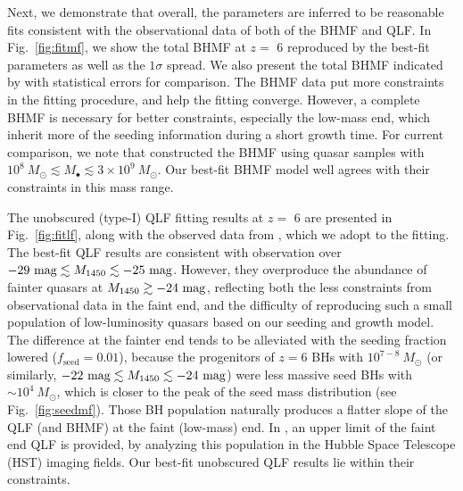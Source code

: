 \documentclass[twocolumn, twocolappendix]{aastex63}
\newcommand{\Msun}{M_\odot}
\newcommand{\Mbh}{M_\bullet}
\newcommand{\fseed}{f_\mathrm{seed}}
\newcommand{\Muv}{M_{1450}}
\begin{document}
\begin{CJK*}{UTF8}{gbsn}
Next, we demonstrate that overall, the parameters are inferred to be reasonable fits consistent with the observational data of both of the BHMF and QLF.
In Fig.~\ref{fig:fitmf}, we show the total BHMF at $z=$ 6 reproduced by the best-fit parameters as well as the $1\sigma$ spread.
We also present the total BHMF indicated by  with statistical errors for comparison.
The BHMF data put more constraints in the fitting procedure, and help the fitting converge.
However, a complete BHMF is necessary for better constraints, especially the low-mass end, 
which inherit more of the seeding information during a short growth time.
For current comparison,
we note that  constructed the BHMF using quasar samples with 
$10^8~\Msun \lesssim \Mbh \lesssim 3\times 10^9~\Msun$.
Our best-fit BHMF model well agrees with their constraints in this mass range.

The unobscured (type-I) QLF fitting results at $z=$ 6 are presented in Fig.~\ref{fig:fitlf},
along with the observed data from , which we adopt to the fitting.
The best-fit QLF results are consistent with observation over $-29~{\rm mag} \lesssim \Muv \lesssim -25~{\rm mag}$.
However, they overproduce the abundance of fainter quasars at $\Muv\gtrsim -24~{\rm mag}$,
reflecting both the less constraints from observational data in the faint end,
and the difficulty of reproducing such a small population of low-luminosity quasars based on our seeding and growth model.
The difference at the fainter end tends to be alleviated with the seeding fraction lowered ($\fseed = 0.01$),
because the progenitors of $z=6$ BHs with $10^{7-8}~\Msun$ (or similarly, 
$-22~{\rm mag} \lesssim \Muv \lesssim -24~{\rm mag}$) were less massive seed BHs with $\sim 10^4~\Msun$,
which is closer to the peak of the seed mass distribution (see Fig.~\ref{fig:seedmf}).
Those BH population naturally produces a flatter slope of the QLF (and BHMF) at the faint (low-mass) end.
In \citet{2022NatAs...6..850J}, an upper limit of the faint end QLF is provided, %
by analyzing this population in the Hubble Space Telescope (HST) imaging fields.
Our best-fit unobscured QLF results lie within their constraints.


\end{CJK*}
\end{document}
